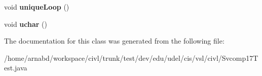 \begin{DoxyCompactItemize}
\item 
\hypertarget{classedu_1_1udel_1_1cis_1_1vsl_1_1civl_1_1Svcomp17Test_ac098b5a52b61f0891c18f35e82223a60}{}void {\bfseries unique\+Loop} ()\label{classedu_1_1udel_1_1cis_1_1vsl_1_1civl_1_1Svcomp17Test_ac098b5a52b61f0891c18f35e82223a60}

\item 
\hypertarget{classedu_1_1udel_1_1cis_1_1vsl_1_1civl_1_1Svcomp17Test_abce4ed3e984344a03bf151d1c2787d08}{}void {\bfseries uchar} ()\label{classedu_1_1udel_1_1cis_1_1vsl_1_1civl_1_1Svcomp17Test_abce4ed3e984344a03bf151d1c2787d08}

\end{DoxyCompactItemize}


The documentation for this class was generated from the following file\+:\begin{DoxyCompactItemize}
\item 
/home/arnabd/workspace/civl/trunk/test/dev/edu/udel/cis/vsl/civl/Svcomp17\+Test.\+java\end{DoxyCompactItemize}
